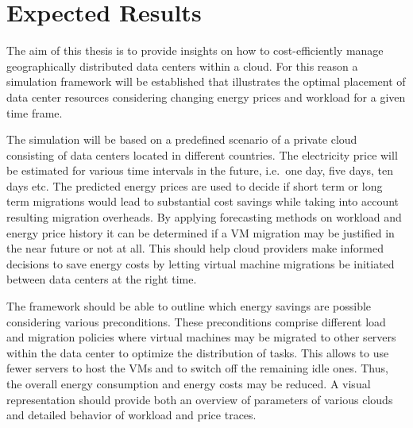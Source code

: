\documentclass[a4paper]{article}
\begin{document}



\section{Expected Results}

The aim of this thesis is to provide insights on how to cost-efficiently manage geographically distributed data centers within a cloud. For this reason a simulation framework will be established that illustrates the optimal placement of data center resources considering changing energy prices and workload for a given time frame. 

The simulation will be based on a predefined scenario of a private cloud consisting of data centers located in different countries. The electricity price will be estimated for various time intervals in the future, i.e.\ one day, five days, ten days etc. The predicted energy prices are used to decide if short term or long term migrations would lead to substantial cost savings while taking into account resulting migration overheads. 
By applying forecasting methods on workload and energy price history it can be determined if a VM migration may be justified in the near future or not at all. 
This should help cloud providers make informed decisions to save energy costs by letting virtual machine migrations be initiated between data centers at the right time. 

The framework should be able to outline which energy savings are possible considering various preconditions. 
These preconditions comprise different load and migration policies where virtual machines may be migrated to other servers within the data center to optimize the distribution of tasks. This allows to use fewer servers to host the VMs and to switch off the remaining idle ones. Thus, the overall energy consumption and energy costs may be reduced. 
A visual representation should provide both an overview of parameters of various clouds and detailed behavior of workload and price traces. 
\end{document}
